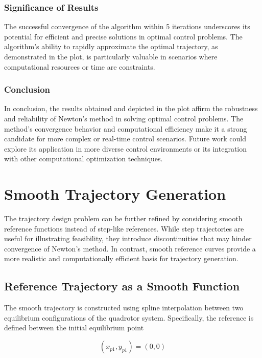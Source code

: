 \documentclass[a4paper,11pt,oneside]{book}
\begin{document}
\subsection{Significance of Results}
The successful convergence of the algorithm within 5 iterations underscores its potential for efficient and precise solutions in optimal control problems. The algorithm's ability to rapidly approximate the optimal trajectory, as demonstrated in the plot, is particularly valuable in scenarios where computational resources or time are constraints.

\subsection{Conclusion}
In conclusion, the results obtained and depicted in the plot affirm the robustness and reliability of Newton's method in solving optimal control problems. The method's convergence behavior and computational efficiency make it a strong candidate for more complex or real-time control scenarios. Future work could explore its application in more diverse control environments or its integration with other computational optimization techniques.


\chapter{Smooth Trajectory Generation}
\label{chap:Smooth_Trajectory}

The trajectory design problem can be further refined by considering smooth reference functions instead of step-like references. While step trajectories are useful for illustrating feasibility, they introduce discontinuities that may hinder convergence of Newton’s method. In contrast, smooth reference curves provide a more realistic and computationally efficient basis for trajectory generation.

\section{Reference Trajectory as a Smooth Function}

The smooth trajectory is constructed using spline interpolation between two equilibrium configurations of the quadrotor system. Specifically, the reference is defined between the initial equilibrium point

$$(x_{p1}, y_{p1}) = (0,0)$$
\end{document}
